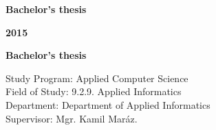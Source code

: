 \begin{center}
\centerline{\LARGE\sc\textbf\skola}
\sc\LARGE\textbf\fakulta
\end{center}

\vspace*{8cm}

\begin{center}
\begin{minipage}{0.8\textwidth}
\begin{center}
 \LARGE\sc\textbf\nazov
 \vspace{1em}
 \centerline{\Large\bf Bachelor's thesis}
\end{center}
\end{minipage}
\end{center}

\vfill
\noindent
 {\bf 2015}  \hfill {\bf \autor}
\thispagestyle{empty}



\newpage
\begin{center}
\centerline{\LARGE\sc\textbf\skola}
\sc\LARGE\textbf\fakulta
\end{center}

\vspace*{8cm}

\begin{center}
\begin{minipage}{0.8\textwidth}
\begin{center}
 \LARGE\sc\textbf\nazov 
\end{center}
\vspace{1em}
\centerline{\Large\bf Bachelor's thesis}
\end{minipage}
\end{center}

\vspace{5cm}

\linespread{1.3}%
\selectfont

\noindent
Study Program: \hspace{0.8em} Applied Computer Science\\
Field of Study: \hspace{0.8em} 9.2.9. Applied Informatics\\
Department: \hspace{0.8em} Department of Applied Informatics\\
Supervisor: \hspace{2.4em} Mgr. Kamil Maráz. 


